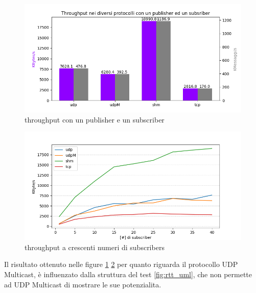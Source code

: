 \begin{figure}[H]
    \includegraphics[width=\textwidth]{./results/test3_throughput_combined.png} 
        \caption{throughput con un publisher e un subscriber}\label{fig:throughput_combined}
\end{figure}

\begin{figure}[H]
    \includegraphics[width=\textwidth]{./results/test3_graph_throughput.png} 
    \caption{throughput a crescenti numeri di subscribers}\label{fig:throughput_increasing}
\end{figure}

Il risultato ottenuto nelle figure \ref{fig:throughput_combined} \ref{fig:throughput_increasing} per quanto riguarda il protocollo UDP Multicast, è influenzato dalla struttura del test \ref{fig:rtt_uml}, che non permette ad UDP Multicast di mostrare le sue potenzialita.



